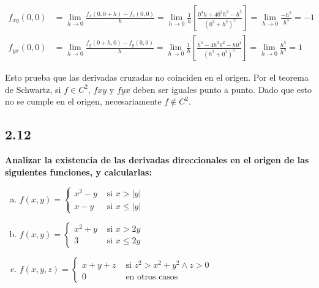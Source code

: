 \documentclass{article}
\begin{document}
\begin{subequations}
\begin{align}
f_{xy}(0,0) &= \lim_{h \rightarrow 0} \frac{f_x(0, 0+h) - f_x(0,0)}{h} = \lim_{h \rightarrow 0} \frac{1}{h} \left[ \frac{0^4 h + 4 0^2 h^3 - h^5}{(0^2 + h^2)^2} \right] = \lim_{h \rightarrow 0} \frac{-h^5}{h^5} = -1 \\
f_{yx}(0,0) &= \lim_{h \rightarrow 0} \frac{f_y(0+h, 0) - f_y(0,0)}{h} = \lim_{h \rightarrow 0} \frac{1}{h} \left[ \frac{h^5 - 4 h^3 0^2 - h 0^4}{(h^2 + 0^2)^2} \right] = \lim_{h \rightarrow 0} \frac{h^5}{h^5} = 1
\end{align}
\end{subequations}

Esto prueba que las derivadas cruzadas no coinciden en el origen. Por el teorema de Schwartz, si $f \in C^2$, $fxy$ y $fyx$ deben ser iguales punto a punto. Dado que esto no se cumple en el origen, necesariamente $f \notin C^2$.

\subsection*{2.12}
\label{subsec:2.12}

\textbf{Analizar la existencia de las derivadas direccionales en el origen de las siguientes funciones, y calcularlas:}

\begin{enumerate}[(a)]
\bfseries

\item $f(x,y) = \left\{ \begin{array}{ll}
x^2 - y &\text{ si } x > |y| \\
x - y &\text{ si } x \leq |y|
\end{array} \right.$

\item $f(x,y) = \left\{ \begin{array}{ll}
x^2 + y &\text{ si } x > 2y \\
3 &\text{ si } x \leq 2y
\end{array} \right.$

\item $f(x,y,z) = \left\{ \begin{array}{ll}
x+y+z &\text{ si } z^2 > x^2 + y^2 \wedge z > 0 \\
0 &\text{ en otros casos }
\end{array} \right.$

\end{enumerate}
\end{document}
